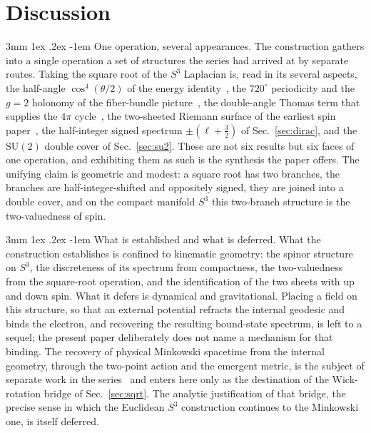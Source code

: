 \documentclass[%
 reprint, amsmath,amssymb, aps, prb, ]{revtex4-2}
\makeatletter
\numberwithin{equation}{section}
\renewcommand\paragraph{%
  \@startsection{paragraph}{4}{\z@}%
    {3mm \@plus 1ex \@minus .2ex}%
    {-1em}%
    {\normalfont\normalsize\itshape}}
\newcommand{\iphase}{\theta}  %
\makeatother
\begin{document}
\section{Discussion}
\label{sec:discussion}

\paragraph{One operation, several appearances.}
The construction gathers into a single operation a set of structures the series had arrived at by separate routes. Taking the square root of the $S^{3}$ Laplacian is, read in its several aspects, the half-angle $\cos^{4}(\iphase/2)$ of the energy identity~\cite{hanamura01}, the $720^{\circ}$ periodicity and the $g=2$ holonomy of the fiber-bundle picture~\cite{hanamura48}, the double-angle Thomas term that supplies the $4\pi$ cycle~\cite{hanamura50}, the two-sheeted Riemann surface of the earliest spin paper~\cite{hanamura03}, the half-integer signed spectrum $\pm(\ell+\tfrac32)$ of Sec.~\ref{sec:dirac}, and the $\mathrm{SU}(2)$ double cover of Sec.~\ref{sec:su2}. These are not six results but six faces of one operation, and exhibiting them as such is the synthesis the paper offers. The unifying claim is geometric and modest: a square root has two branches, the branches are half-integer-shifted and oppositely signed, they are joined into a double cover, and on the compact manifold $S^{3}$ this two-branch structure is the two-valuedness of spin.

\paragraph{What is established and what is deferred.}
What the construction establishes is confined to kinematic geometry: the spinor structure on $S^{3}$, the discreteness of its spectrum from compactness, the two-valuedness from the square-root operation, and the identification of the two sheets with up and down spin. What it defers is dynamical and gravitational. Placing a field on this structure, so that an external potential refracts the internal geodesic and binds the electron, and recovering the resulting bound-state spectrum, is left to a sequel; the present paper deliberately does not name a mechanism for that binding. The recovery of physical Minkowski spacetime from the internal geometry, through the two-point action and the emergent metric, is the subject of separate work in the series~\cite{hanamura51,hanamura63} and enters here only as the destination of the Wick-rotation bridge of Sec.~\ref{sec:sqrt}. The analytic justification of that bridge, the precise sense in which the Euclidean $S^{3}$ construction continues to the Minkowski one, is itself deferred.
\end{document}
